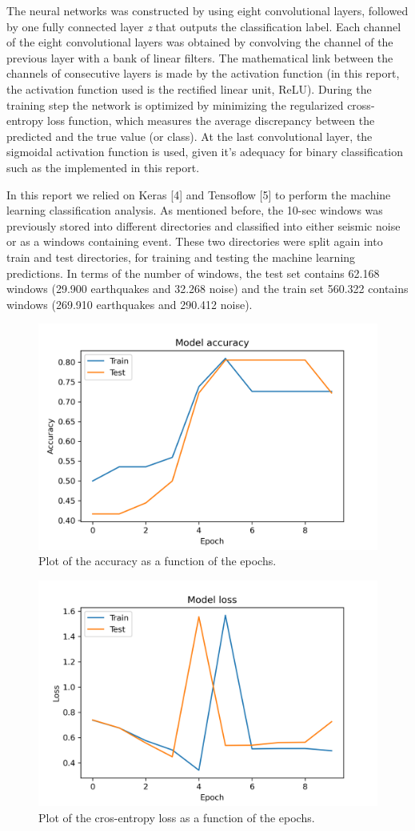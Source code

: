 \documentclass{article}
\begin{document}
The neural networks was constructed by using eight convolutional layers, followed by one fully connected layer \textit{z} that outputs the classification label. Each channel of the eight convolutional layers was obtained by convolving the channel of the previous layer with a bank of linear filters. The mathematical link between the channels of consecutive layers is made by the activation function (in this report, the activation function used is the rectified linear unit, ReLU). During the training step the network is optimized by minimizing the regularized cross-entropy loss function, which measures the average discrepancy between the predicted and the true value (or class). At the last convolutional layer, the sigmoidal activation function is used, given it's adequacy for binary classification such as the implemented in this report. 

In this report we relied on Keras [4] and Tensoflow [5] to perform the machine learning classification analysis. As mentioned before, the 10-sec windows was previously stored into different directories and classified into either seismic noise or as a windows containing event. These two directories were split again into train and test directories, for training and testing the machine learning predictions. In terms of the number of windows, the test set contains 62.168 windows (29.900 earthquakes and 32.268 noise) and the train set 560.322 contains windows (269.910 earthquakes and 290.412 noise). 


\begin{figure}[h!]
    \centering
    \includegraphics[width=0.6\linewidth,height=0.4\linewidth]{images/accuracy.png}
    \caption{Plot of the accuracy as a function of the epochs.}
    \label{fig:accuracy}
\end{figure}

\begin{figure}[h!]
    \centering
    \includegraphics[width=0.6\linewidth,height=0.4\linewidth]{images/loss.png}
    \caption{Plot of the cros-entropy loss as a function of the epochs.}
    \label{fig:loss}
\end{figure}
\end{document}
